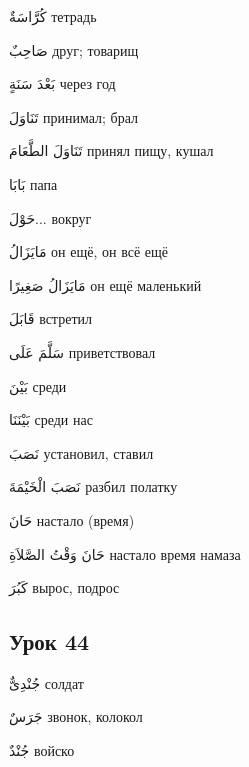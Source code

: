 \documentclass[a5paper]{article}
\newcommand\textstyleDropCaps[1]{#1}
\newcommand\textstyleCaptioncharacters[1]{#1}
\begin{document}
\textstyleCaptioncharacters{كُرَّاسَةٌ }\textstyleDropCaps{тетрадь‎}

\textstyleCaptioncharacters{صَاحِبٌ }\textstyleDropCaps{друг; товарищ‎}

\textstyleCaptioncharacters{بَعْدَ سَنَةٍ }\textstyleDropCaps{через год‎}

\textstyleCaptioncharacters{تَنَاوَلَ }\textstyleDropCaps{принимал; брал‎}

\textstyleCaptioncharacters{تَنَاوَلَ الطَّعَامَ }\textstyleDropCaps{принял пищу, кушал‎}

\textstyleCaptioncharacters{بَابَا }\textstyleDropCaps{папа‎}

\textstyleCaptioncharacters{حَوْلَ...ِ }\textstyleDropCaps{вокруг‎}

\textstyleCaptioncharacters{مَايَزَالُ }\textstyleDropCaps{он ещё, он всё ещё‎}

\textstyleCaptioncharacters{مَايَزَالُ صَغِيرًا }\textstyleDropCaps{он ещё маленький‎}

\textstyleCaptioncharacters{قَابَلَ }\textstyleDropCaps{встретил‎}

\textstyleCaptioncharacters{سَلَّمَ عَلَى }\textstyleDropCaps{приветствовал‎}

\textstyleCaptioncharacters{بَيْنَ }\textstyleDropCaps{среди‎}

\textstyleCaptioncharacters{بَيْنَنَا }\textstyleDropCaps{среди нас‎}

\textstyleCaptioncharacters{نَصَبَ }\textstyleDropCaps{установил, ставил‎}

\textstyleCaptioncharacters{نَصَبَ الْخَيْمَةَ }\textstyleDropCaps{разбил по­латку‎}

\textstyleCaptioncharacters{حَانَ }\textstyleDropCaps{настало (время)‎}

\textstyleCaptioncharacters{حَانَ وَقْتُ الصَّلاَةِ }\textstyleDropCaps{на­стало время намаза‎}

\textstyleCaptioncharacters{كَبُرَ }\textstyleDropCaps{вырос, подрос‎}

\subsection[Урок 44‎]{\textstyleDropCaps{Урок 44‎}}
\textstyleCaptioncharacters{جُنْدِىٌّ }\textstyleDropCaps{солдат‎}

\textstyleCaptioncharacters{جَرَسٌ }\textstyleDropCaps{звонок, колокол‎}

\textstyleCaptioncharacters{جُنْدٌ }\textstyleDropCaps{войско‎}
\end{document}
